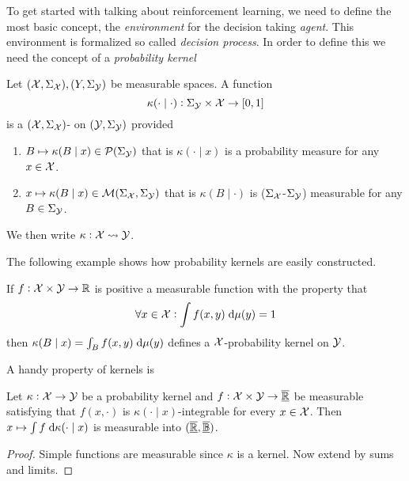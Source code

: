 


To get started with talking about reinforcement learning,
we need to define the most basic concept, the
\emph{environment} for the decision taking \emph{agent}.
This environment is formalized so called \emph{decision process}.
In order to define this we need the concept of a \emph{probability kernel}

\begin{defn}
  Let $(\mathcal{X}, \Sigma_\mathcal{X}), (Y, \Sigma_\mathcal{Y})$ be measurable spaces.
  A function
  \[ \kappa(\cdot \mid \cdot) : \Sigma_\mathcal{Y} \times \mathcal{X} \to [0,1] \]
  is a $(\mathcal{X}, \Sigma_\mathcal{X})$-
  on $(\mathcal{Y}, \Sigma_\mathcal{Y})$ provided
  \begin{enumerate}
    \item $B \mapsto \kappa(B \mid x) \in \mathcal{P}(\Sigma_\mathcal{Y})$
      that is $\kappa(\cdot \mid x)$ is a probability measure
      for any $x \in \mathcal{X}$.
    \item
      $x \mapsto \kappa(B \mid x) \in \mathcal{M}(\Sigma_\mathcal{X}, \Sigma_\mathcal{Y})$
      that is $\kappa(B \mid \cdot)$ is ($\Sigma_\mathcal{X}$-$\Sigma_\mathcal{Y}$)
      measurable for any $B \in \Sigma_\mathcal{Y}$.
  \end{enumerate}
  We then write $\kappa : \mathcal{X} \leadsto \mathcal{Y}$.
  \label{defn:probKer}
\end{defn}

The following example shows how probability kernels are easily constructed.
\begin{example}
  If $f : \mathcal{X} \times \mathcal{Y} \to \mathbb{R}$ is positive a measurable function with
  the property that
  \[ \forall x \in \mathcal{X} : \int f(x, y) \; \mathrm{d} \mu(y) = 1 \]
  then $\kappa(B \mid x) = \int_B f(x, y) \; \mathrm{d} \mu(y)$ defines a
  $\mathcal{X}$-probability kernel on $\mathcal{Y}$.
\end{example}

A handy property of kernels is
\begin{prop}
  Let $\kappa : \mathcal{X} \to \mathcal{Y}$ be a probability kernel
  and $f : \mathcal{X} \times \mathcal{Y} \to \overline{\underline{\mathbb{R}}}$ be measurable satisfying
  that $f(x, \cdot)$ is $\kappa(\cdot \mid x)$-integrable for every $x \in \mathcal{X}$.
  Then $x \mapsto \int f \; \mathrm{d} \kappa(\cdot \mid x)$ is measurable
  into $(\overline{\underline{\mathbb{R}}}, \overline{\underline{\mathbb{B}}})$.
  \label{prop:intKerMeas}
\end{prop}
\begin{proof}
  Simple functions are measurable since $\kappa$ is a kernel.
  Now extend by sums and limits.
\end{proof}

